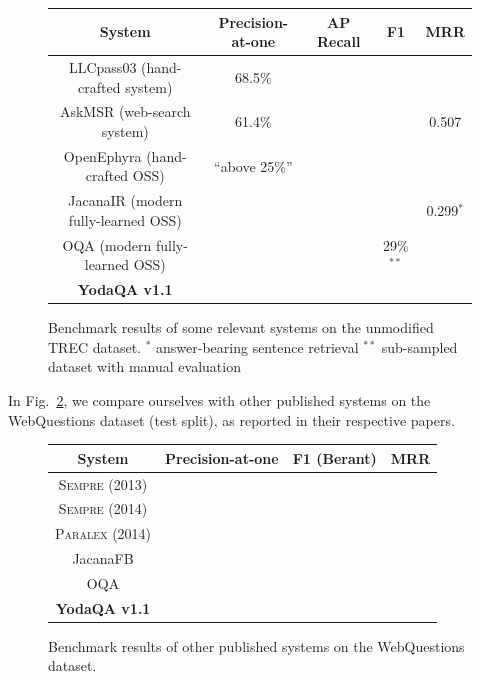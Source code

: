 \begin{figure}[t]
\centering
\begin{tabular}{|c|cccc|}
\hline
System & Precision-at-one & AP Recall & F1 & MRR \\ \hline
LLCpass03 \citep{LCC} (hand-crafted system) & 68.5\% & & & \\
AskMSR \citep{AskMSR} (web-search system) & 61.4\% & & & 0.507 \\ \hline
OpenEphyra \citep{Ephyra2006} (hand-crafted OSS) & ``above 25\%'' & & & \\
JacanaIR \citep{TreeEditIR2013Yao} (modern fully-learned OSS) & & & & 0.299$^*$ \\
OQA \citep{OQA} (modern fully-learned OSS) & & & 29\%$^{**}$ & \\ \hline
\textbf{YodaQA v1.1} &  &  &  &  \\
\hline
\end{tabular}
\vspace*{-0.2cm}
\caption{Benchmark results of some relevant systems on the unmodified TREC dataset.\quad
$^*$ answer-bearing sentence retrieval\quad
$^{**}$ sub-sampled dataset with manual evaluation}
\label{fig:bench}
\end{figure}

In Fig.~\ref{fig:wqbench}, we compare ourselves with other published systems
on the WebQuestions dataset (test split), as reported in their respective papers.

\begin{figure}[t]
\centering
\begin{tabular}{|c|ccc|}
\hline
System & Precision-at-one & F1 (Berant) & MRR \\ \hline
\textsc{Sempre} (2013) & & & \\
\textsc{Sempre} (2014) & & & \\
\textsc{Paralex} (2014) & & & \\
JacanaFB & & & \\
OQA \citep{OQA} & & & \\ \hline
\textbf{YodaQA v1.1} & & & \\
\hline
\end{tabular}
\vspace*{-0.2cm}
\caption{Benchmark results of other published systems on the WebQuestions dataset.}
\label{fig:wqbench}
\end{figure}
